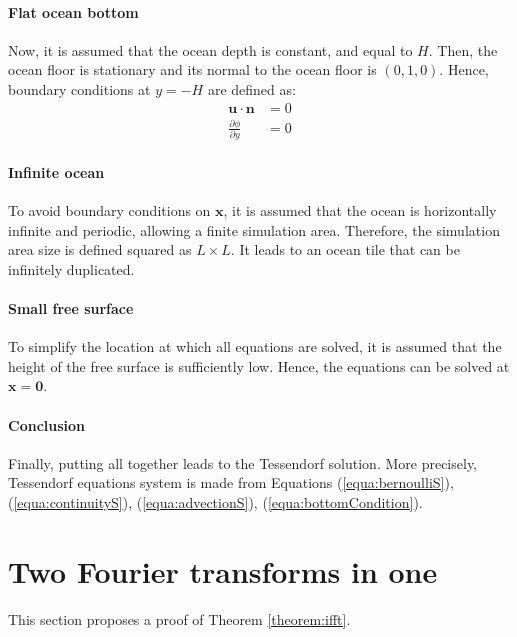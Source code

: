 \documentclass[final]{jcgt}
\begin{document}
\paragraph{Flat ocean bottom}
Now, it is assumed that the ocean depth is constant, and equal to $H$.
Then, the ocean floor is stationary and its normal to the ocean floor is $(0,1,0)$.
Hence, boundary conditions at $y=-H$ are defined as:
\begin{equation}
	\begin{aligned}
		\mathbf{u}\cdot\mathbf{n}        & = 0 \\
		\frac{\partial \phi}{\partial y} & = 0
	\end{aligned}
	\label{equa:bottomCondition}
\end{equation}

\paragraph{Infinite ocean}
To avoid boundary conditions on $\mathbf x$, it is assumed that the ocean is horizontally infinite and periodic, allowing a finite simulation area.
Therefore, the simulation area size is defined squared as $L \times L$.
It leads to an ocean tile that can be infinitely duplicated.

\paragraph{Small free surface}
To simplify the location at which all equations are solved, it is assumed that the height of the free surface is sufficiently low. Hence, the equations can be solved at $\mathbf x=\mathbf0$.

\paragraph{Conclusion}
Finally, putting all together leads to the Tessendorf solution.
More precisely, Tessendorf equations system is made from Equations (\ref{equa:bernoulliS}), (\ref{equa:continuityS}), (\ref{equa:advectionS}), (\ref{equa:bottomCondition}).


\section{Two Fourier transforms in one}
\label{sec:annexe-2IFFT}
This section proposes a proof of Theorem \ref{theorem:ifft}.
\end{document}
